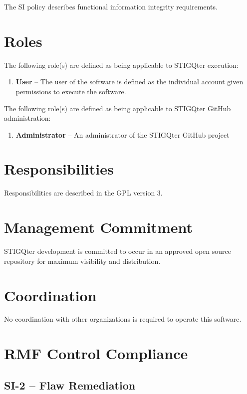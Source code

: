 \documentclass[letterpaper, 10pt, twoside]{article}
\begin{document}
The SI policy describes functional information integrity requirements.

\section{Roles}
\label{sec:roles}

The following role(s) are defined as being applicable to STIGQter execution:
\begin{enumerate}
	\item \textbf{User} -- The user of the software is defined as the individual account given permissions to execute the software.
\end{enumerate}

The following role(s) are defined as being applicable to STIGQter GitHub administration:
\begin{enumerate}
	\item \textbf{Administrator} -- An administrator of the STIGQter GitHub project
\end{enumerate}

\section{Responsibilities}
\label{sec:responsibilities}

Responsibilities are described in the GPL version 3.

\section{Management Commitment}

STIGQter development is committed to occur in an approved open source repository for maximum visibility and distribution.

\section{Coordination}

No coordination with other organizations is required to operate this software.

\section{RMF Control Compliance}

\subsection{SI-2 -- Flaw Remediation}
\end{document}
